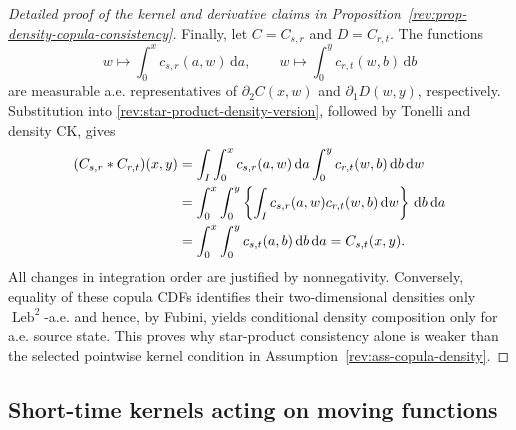 \documentclass[11pt]{article}
\theoremstyle{remark}
\newcommand{\dd}{\,\mathrm d}
\newcommand{\Leb}{\operatorname{Leb}}
\begin{document}
\begin{proof}[Detailed proof of the kernel and derivative claims in
Proposition~\ref{rev:prop-density-copula-consistency}]
Finally, let $C=C_{s,r}$ and $D=C_{r,t}$.  The functions
\[
w\longmapsto\int_0^xc_{s,r}(a,w)\dd a,
\qquad
w\longmapsto\int_0^yc_{r,t}(w,b)\dd b
\]
are measurable a.e. representatives of $\partial_2C(x,w)$ and
$\partial_1D(w,y)$, respectively.  Substitution into
\eqref{rev:star-product-density-version}, followed by Tonelli and density CK,
gives
\begin{align}
(C_{s,r}*C_{r,t})(x,y)
&=\int_I\int_0^xc_{s,r}(a,w)\dd a
             \int_0^yc_{r,t}(w,b)\dd b\dd w\notag\\
&=\int_0^x\int_0^y
     \left\{\int_Ic_{s,r}(a,w)c_{r,t}(w,b)\dd w\right\}\dd b\dd a\notag\\
&=\int_0^x\int_0^yc_{s,t}(a,b)\dd b\dd a
=C_{s,t}(x,y).
\label{rev:app-star-product-integral}
\end{align}
All changes in integration order are justified by nonnegativity.  Conversely,
equality of these copula CDFs identifies their two-dimensional densities only
$\Leb^2$-a.e. and hence, by Fubini, yields conditional density composition only
for a.e. source state.  This proves why star-product consistency alone is weaker
than the selected pointwise kernel condition in
Assumption~\ref{rev:ass-copula-density}.
\end{proof}

\subsection{Short-time kernels acting on moving functions}
\end{document}
